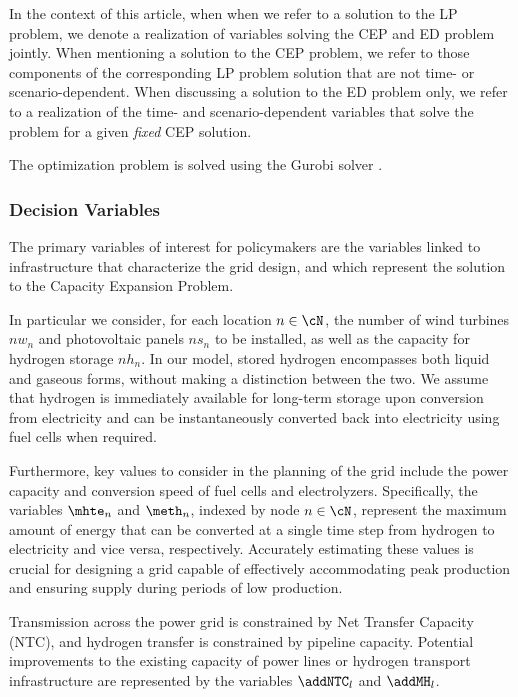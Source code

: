 \documentclass[smallextended,natbib]{svjour3}       %
\numberwithin{definition}{section}
\numberwithin{theorem}{section}
\numberwithin{proposition}{section}
\begin{document}
In the context of this article, when when we refer to a solution to the LP problem, we denote a realization of variables solving the CEP and ED problem jointly. 
When mentioning a solution to the CEP problem, we refer to those components of the corresponding LP problem solution that are not time- or scenario-dependent. 
When discussing a solution to the ED problem only, we refer to a realization of the time- and scenario-dependent variables that solve the problem for a given \textit{fixed} CEP solution.

The optimization problem is solved using the Gurobi solver \citep{INTRO_gurobi}.



\subsubsection{Decision Variables}

The primary variables of interest for policymakers are the variables linked to infrastructure that characterize the grid design, and which represent the solution to the Capacity Expansion Problem.

In particular we consider, for each location \( n\in\cN \), the number of wind turbines $nw_n$ and photovoltaic panels $ns_n$ to be installed, as well as the capacity for hydrogen storage $nh_n$. 
In our model, stored hydrogen encompasses both liquid and gaseous forms, without making a distinction between the two. 
We assume that hydrogen is immediately available for long-term storage upon conversion from electricity and can be instantaneously converted back into electricity using fuel cells when required.

Furthermore, key values to consider in the planning of the grid include the power capacity and conversion speed of fuel cells and electrolyzers. 
Specifically, the variables \( \mhte_n \) and \( \meth_n \), indexed by node \( n \in \cN\), represent the maximum amount of energy that can be converted at a single time step from hydrogen to electricity and vice versa, respectively. 
Accurately estimating these values is crucial for designing a grid capable of effectively accommodating peak production and ensuring supply during periods of low production.

Transmission across the power grid is constrained by Net Transfer Capacity (NTC), and hydrogen transfer is constrained by pipeline capacity.
Potential improvements to the existing capacity of power lines or hydrogen transport infrastructure are represented by the variables \( \addNTC_l \) and \( \addMH_l \).
\end{document}
